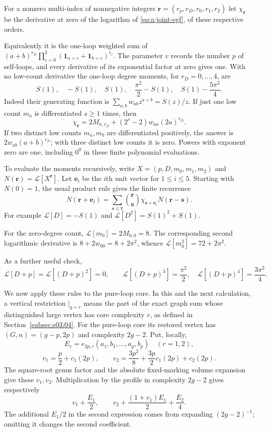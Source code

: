 For a nonzero multi-index of nonnegative integers
$\mathbf r=(r_p,r_D,r_0,r_1,r_2)$ let
$\chi_{\mathbf r}$ be the derivative at zero of the logarithm of
\eqref{eq:a:joint-egf}, of these respective orders.

Equivalently it is
the one-loop weighted sum of
$(a+b)^{r_D}\prod_{c=0}^2(\mathbf1_{a=c}+\mathbf1_{b=c})^{r_c}$.
The parameter $v$ records the number $p$ of self-loops, and every
derivative of its exponential factor at zero gives one.
With no low-count
derivative the one-loop degree moments, for $r_D=0,\ldots,4$, are
\begin{equation}\label{eq:a:degree-cumulants}
 S(1),\quad -S(1),\quad S(1),\quad
 \frac{\pi^2}{2}-S(1),\quad S(1)-\frac{5\pi^2}{4}.
\end{equation}
Indeed their generating function is
$\sum_{a,b}w_{ab}z^{a+b}=S(z)/z$.
If just one low count $m_a$ is differentiated $s\geq1$ times, then
\[
 \chi_{\mathbf r}=2M_{a,r_D}
        +(2^s-2)w_{aa}(2a)^{r_D}.
\]
If two distinct low counts $m_a,m_b$ are differentiated positively,
the answer is $2w_{ab}(a+b)^{r_D}$; with three distinct low counts it
is zero. Powers with exponent zero are one, including $0^0$ in these
finite polynomial evaluations.

To evaluate the moments recursively, write $X=(p,D,m_0,m_1,m_2)$ and
$N(\mathbf r)=\mathcal L[X^{\mathbf r}]$. Let $\mathbf e_i$ be
the $i$th unit vector for $1\leq i\leq5$. Starting with $N(0)=1$,
the usual product rule gives the finite recurrence
\begin{equation}\label{eq:a:bell-rule}
 N(\mathbf r+\mathbf e_i)=
 \sum_{\mathbf s\leq\mathbf r}\binom{\mathbf r}{\mathbf s}
       \chi_{\mathbf s+\mathbf e_i}N(\mathbf r-\mathbf s).
\end{equation}
For example $\mathcal L[D]=-S(1)$ and
$\mathcal L[D^2]=S(1)^2+S(1)$.

For the zero-degree count, $\mathcal L[m_0]=2M_{0,0}=8$.
The corresponding second logarithmic derivative is
$8+2w_{00}=8+2\pi^2$, whence
$\mathcal L[m_0^2]=72+2\pi^2$.

As a further useful check,
\[
 \mathcal L[D+p]=\mathcal L[(D+p)^2]=0,\qquad
 \mathcal L[(D+p)^3]=\frac{\pi^2}{2},\quad
 \mathcal L[(D+p)^4]=\frac{3\pi^2}{4}.
\]

We now apply these rules to the pure-loop core. In this and the next
calculation, a vertical restriction $\big|_{q=r}$ means the part of
the exact graph sum whose distinguished large vertex has core
complexity $r$, as defined in Section~\ref{subsec:s03:04}.
For the pure-loop core its restored vertex has $(G,n)=(g-p,2p)$ and
complexity $2g-2$. Put, locally,
\[
 E_r=e_{2p,r}(a_1,b_1,\ldots,a_p,b_p)\quad(r=1,2),
\]
\[
 v_1=\frac p2+c_1(2p),\qquad
 v_2=\frac{3p^2}{8}+\frac{3p}{2}c_1(2p)+c_2(2p).
\]
The square-root genus factor and the absolute fixed-marking volume
expansion give these $v_1,v_2$. Multiplication by the profile in
complexity $2g-2$ gives respectively
\begin{equation}\label{eq:a:pure-loop-polynomials}
 v_1+\frac{E_1}{2},\qquad
 v_2+\frac{(1+v_1)E_1}{2}+\frac{E_2}{4}.
\end{equation}
The additional $E_1/2$ in the second expression comes from expanding
$(2g-2)^{-1}$; omitting it changes the second coefficient.

